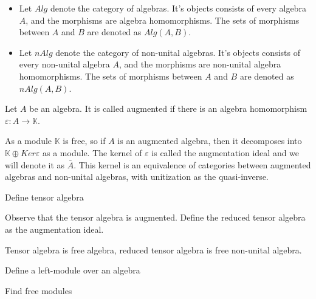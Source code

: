 \documentclass[../../thesis.tex]{subfiles}
\begin{document}
            \begin{definition}
                \begin{itemize}
                    \item Let $Alg$ denote the category of algebras. It's objects consists of every algebra $A$, and the morphisms are algebra homomorphisms. The sets of morphisms between $A$ and $B$ are denoted as $Alg(A,B)$.
                    \item Let $nAlg$ denote the category of non-unital algebras. It's objects consists of every non-unital algebra $A$, and the morphisms are non-unital algebra homomorphisms. The sets of morphisms between $A$ and $B$ are denoted as $nAlg(A,B)$.
                \end{itemize}
            \end{definition}

            \begin{definition}
                Let $A$ be an algebra. It is called augmented if there is an algebra homomorphism $\varepsilon : A \rightarrow \mathbb{K}$.
            \end{definition}

            As a module $\mathbb{K}$ is free, so if $A$ is an augmented algebra, then it decomposes into $\mathbb{K}\oplus Ker\varepsilon$ as a module. The kernel of $\varepsilon$ is called the augmentation ideal and we will denote it as $\bar{A}$. This kernel is an equivalence of categories between augmented algebras and non-unital algebras, with unitization as the quasi-inverse.

            \begin{definition}
                Define tensor algebra
            \end{definition}

            Observe that the tensor algebra is augmented. Define the reduced tensor algebra as the augmentation ideal.

            \begin{proposition}
                Tensor algebra is free algebra, reduced tensor algebra is free non-unital algebra.
            \end{proposition}

            \begin{definition}
                Define a left-module over an algebra 
            \end{definition}

            \begin{proposition}
                Find free modules
            \end{proposition}
            
\end{document}
